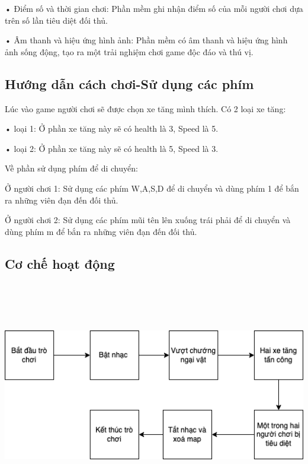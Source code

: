 \documentclass[a4paper]{article}
\begin{document}
	•	Điểm số và thời gian chơi: Phần mềm ghi nhận điểm số của mỗi người chơi dựa trên số lần tiêu diệt đối thủ.

	•	Âm thanh và hiệu ứng hình ảnh: Phần mềm có âm thanh và hiệu ứng hình ảnh sống động, tạo ra một trải nghiệm chơi game độc đáo và thú vị.

	\subsection{Hướng dẫn cách chơi-Sử dụng các phím}

        Lúc vào game người chơi sẽ được chọn xe tăng mình thích. Có 2 loại xe tăng: 
        
        •	loại 1: Ở phần xe tăng này sẽ có health là 3, Speed là 5.

	•	loại 2: Ở phần xe tăng này sẽ có health là 5, Speed là 3.

        Về phần sử dụng phím để di chuyển:

	Ở người chơi 1: Sử dụng các phím W,A,S,D để di chuyển và dùng phím 1 để bắn ra những viên đạn đến đối thủ.
 
       Ở người chơi 2: Sử dụng các phím mũi tên lên xuống trái phải để di chuyển và dùng phím m để bắn ra những viên đạn đến đối thủ.

       \subsection{Cơ chế hoạt động}

    	\includegraphics[width=15cm,height=10cm]{Tankhd.png}
 
\end{document}
